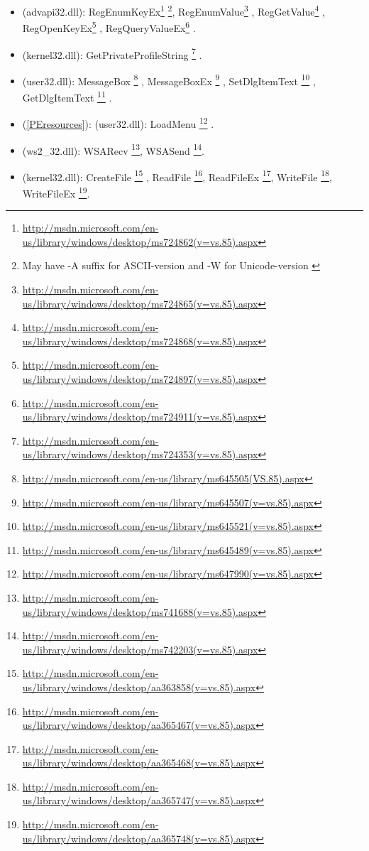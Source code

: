 \begin{itemize}

\item
{} (advapi32.dll): 
RegEnumKeyEx\footnote{\url{http://msdn.microsoft.com/en-us/library/windows/desktop/ms724862(v=vs.85).aspx}}
\footnote{
	{May have -A suffix for ASCII-version and -W for Unicode-version}
	\label{note1}},
RegEnumValue\footnote{\url{http://msdn.microsoft.com/en-us/library/windows/desktop/ms724865(v=vs.85).aspx}}
,
RegGetValue\footnote{\url{http://msdn.microsoft.com/en-us/library/windows/desktop/ms724868(v=vs.85).aspx}}
,
RegOpenKeyEx\footnote{\url{http://msdn.microsoft.com/en-us/library/windows/desktop/ms724897(v=vs.85).aspx}}
,
RegQueryValueEx\footnote{\url{http://msdn.microsoft.com/en-us/library/windows/desktop/ms724911(v=vs.85).aspx}}
.

\item
{} (kernel32.dll): 
GetPrivateProfileString
\footnote{\url{http://msdn.microsoft.com/en-us/library/windows/desktop/ms724353(v=vs.85).aspx}}
.

\item
{} (user32.dll): 
MessageBox
\footnote{\url{http://msdn.microsoft.com/en-us/library/ms645505(VS.85).aspx}}
, 
MessageBoxEx
\footnote{\url{http://msdn.microsoft.com/en-us/library/ms645507(v=vs.85).aspx}}
,
SetDlgItemText
\footnote{\url{http://msdn.microsoft.com/en-us/library/ms645521(v=vs.85).aspx}}
,
GetDlgItemText
\footnote{\url{http://msdn.microsoft.com/en-us/library/ms645489(v=vs.85).aspx}}
.

\item
{}(\ref{PEresources}): (user32.dll): LoadMenu
\footnote{\url{http://msdn.microsoft.com/en-us/library/ms647990(v=vs.85).aspx}}
.
\item
{} (ws2\_32.dll):
WSARecv
\footnote{\url{http://msdn.microsoft.com/en-us/library/windows/desktop/ms741688(v=vs.85).aspx}},
WSASend
\footnote{\url{http://msdn.microsoft.com/en-us/library/windows/desktop/ms742203(v=vs.85).aspx}}.

\item
{} (kernel32.dll):
CreateFile
\footnote{\url{http://msdn.microsoft.com/en-us/library/windows/desktop/aa363858(v=vs.85).aspx}}
,
ReadFile
\footnote{\url{http://msdn.microsoft.com/en-us/library/windows/desktop/aa365467(v=vs.85).aspx}},
ReadFileEx
\footnote{\url{http://msdn.microsoft.com/en-us/library/windows/desktop/aa365468(v=vs.85).aspx}},
WriteFile
\footnote{\url{http://msdn.microsoft.com/en-us/library/windows/desktop/aa365747(v=vs.85).aspx}},
WriteFileEx
\footnote{\url{http://msdn.microsoft.com/en-us/library/windows/desktop/aa365748(v=vs.85).aspx}}.


\end{itemize}
